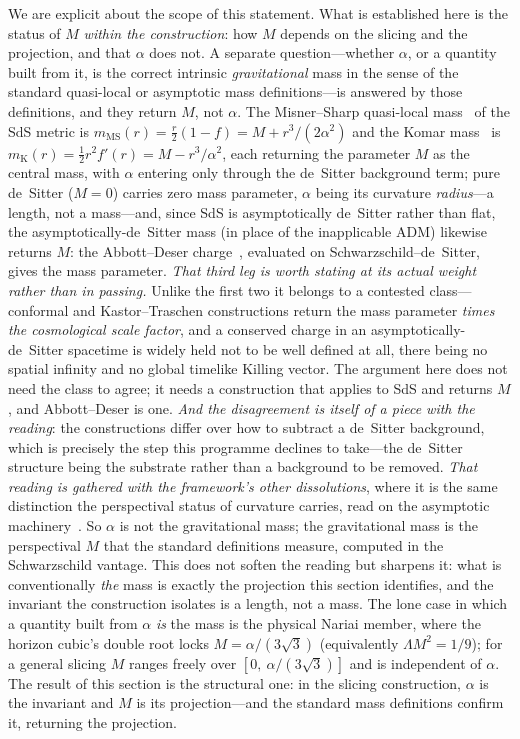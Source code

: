 \documentclass[11pt,a4paper]{article}
\theoremstyle{definition}
\begin{document}
We are explicit about the scope of this statement. What is established here is the status of $M$ \emph{within the construction}: how $M$ depends on the slicing and the projection, and that $\alpha$ does not. A separate question---whether $\alpha$, or a quantity built from it, is the correct intrinsic \emph{gravitational} mass in the sense of the standard quasi-local or asymptotic mass definitions---is answered by those definitions, and they return $M$, not $\alpha$. The Misner--Sharp quasi-local mass~\cite{MisnerSharp1964} of the SdS metric is $m_{\mathrm{MS}}(r)=\tfrac{r}{2}(1-f)=M+r^{3}/(2\alpha^{2})$ and the Komar mass~\cite{Komar1959} is $m_{\mathrm{K}}(r)=\tfrac12 r^{2}f'(r)=M-r^{3}/\alpha^{2}$, each returning the parameter $M$ as the central mass, with $\alpha$ entering only through the de~Sitter background term; pure de~Sitter ($M=0$) carries zero mass parameter, $\alpha$ being its curvature \emph{radius}---a length, not a mass---and, since SdS is asymptotically de~Sitter rather than flat, the asymptotically-de~Sitter mass (in place of the inapplicable ADM) likewise returns $M$: the Abbott--Deser charge~\cite{AbbottDeser1982}, evaluated on Schwarzschild--de~Sitter, gives the mass parameter. \emph{That third leg is worth stating at its actual weight rather than in passing.} Unlike the first two it belongs to a contested class---conformal and Kastor--Traschen constructions return the mass parameter \emph{times the cosmological scale factor}, and a conserved charge in an asymptotically-de~Sitter spacetime is widely held not to be well defined at all, there being no spatial infinity and no global timelike Killing vector. The argument here does not need the class to agree; it needs a construction that applies to SdS and returns $M$, and Abbott--Deser is one. \emph{And the disagreement is itself of a piece with the reading}: the constructions differ over how to subtract a de~Sitter background, which is precisely the step this programme declines to take---the de~Sitter structure being the substrate rather than a background to be removed. \emph{That reading is gathered with the framework's other dissolutions}, where it is the same distinction the perspectival status of curvature carries, read on the asymptotic machinery~\cite{JanzenCRframework}. So $\alpha$ is not the gravitational mass; the gravitational mass is the perspectival $M$ that the standard definitions measure, computed in the Schwarzschild vantage. This does not soften the reading but sharpens it: what is conventionally \emph{the} mass is exactly the projection this section identifies, and the invariant the construction isolates is a length, not a mass. The lone case in which a quantity built from $\alpha$ \emph{is} the mass is the physical Nariai member, where the horizon cubic's double root locks $M=\alpha/(3\sqrt3)$ (equivalently $\Lambda M^{2}=1/9$); for a general slicing $M$ ranges freely over $[0,\ \alpha/(3\sqrt3)]$ and is independent of $\alpha$. The result of this section is the structural one: in the slicing construction, $\alpha$ is the invariant and $M$ is its projection---and the standard mass definitions confirm it, returning the projection.
\end{document}
